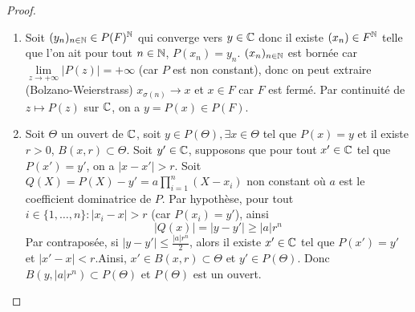 \begin{proof}
	\phantom{}
	\begin{enumerate}
		\item Soit $(y_{n})_{n\in\mathbb{N}}\in P(F)^{\mathbb{N}}$ qui converge vers $y\in\mathbb{C}$ donc il existe $(x_{n})\in F^{\mathbb{N}}$ telle que l'on ait pour tout $n\in\mathbb{N}$, $P(x_{n})=y_{n}$. $(x_{n})_{n\in\mathbb{N}}$ est bornée car $\lim\limits_{z\to+\infty}\vert P(z)\vert=+\infty$ (car $P$ est non constant), donc on peut extraire (Bolzano-Weierstrass) $x_{\sigma(n)}\to x$ et $x\in F$ car $F$ est fermé. Par continuité de $z\mapsto P(z)$ sur $\mathbb{C}$, on a $y=P(x)\in P(F)$.
		
		\item Soit $\Theta$ un ouvert de $\mathbb{C}$, soit $y\in P(\Theta),\exists x\in\Theta$ tel que $P(x)=y$ et il existe $r>0$, $B(x,r)\subset\Theta$. Soit $y'\in\mathbb{C}$, supposons que pour tout $x'\in\mathbb{C}$ tel que $P(x')=y'$, on a $\vert x-x'\vert>r$. Soit $Q(X)=P(X)-y'=a\prod_{i=1}^{n}(X-x_{i})$ non constant où $a$ est le coefficient dominatrice de $P$. Par hypothèse, pour tout $i\in\{1,\dots,n\}\colon\vert x_{i}-x\vert>r$ (car $P(x_{i})=y'$), ainsi 
		\begin{equation}\vert Q(x)\vert=\vert y-y'\vert\geqslant\vert a\vert r^{n}\end{equation}
		Par contraposée, si $\vert y-y'\vert\leqslant\frac{\vert a\vert r^{n}}{2}$, alors il existe $x'\in\mathbb{C}$ tel que $P(x')=y'$ et $\vert x'-x\vert<r$.Ainsi, $x'\in B(x,r)\subset\Theta$ et $y'\in P(\Theta)$. Donc $B(y,\vert a\vert r^{n})\subset P(\Theta)$ et $P(\Theta)$ est un ouvert.
	\end{enumerate}
\end{proof}

